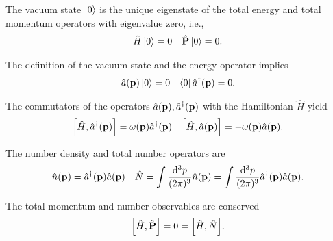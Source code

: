 \begin{definition}\label{def:vacuum_state}
	The vacuum state $\ket{0}$ is the unique eigenstate of the total energy and total momentum operators with eigenvalue zero, i.e.,
	\begin{align}
		\hat{H}
		\ket{0}
		=
		0
		&&
		\hat{\vb{P}}
		\ket{0}
		=
		0
		.
	\end{align}
\end{definition}
\begin{corollary}\label{thm:vacuum_state_ac}
	The definition of the vacuum state and the energy operator implies
	\begin{align}
		\hat{a}(\vb{p})
		\ket{0}
		=
		0
		&&
		\bra{0}
		\hat{a}^\dagger(\vb{p})
		=
		0
		.
	\end{align}
\end{corollary}
\begin{corollary}
	The commutators of the operators $\hat{a}(\vb{p}),\hat{a}^\dagger(\vb{p})$ with the Hamiltonian $\hat{H}$ yield
	\begin{align}
		\comm{\hat{H}}{\hat{a}^\dagger(\vb{p})}
		=
		\omega(\vb{p})
		\hat{a}^\dagger(\vb{p})
		&&
		\comm{\hat{H}}{\hat{a}(\vb{p})}
		=
		-
		\omega(\vb{p})
		\hat{a}(\vb{p})
		.
	\end{align}
\end{corollary}
\begin{definition}
	The number density and total number operators are
	\begin{align}
		\hat{n}(\vb{p})
		=
		\hat{a}^\dagger(\vb{p})
		\hat{a}(\vb{p})
		&&
		\hat{N}
		=
		\int\frac{\dd[3]{p}}{(2\pi)^3}
		\hat{n}(\vb{p})
		=
		\int\frac{\dd[3]{p}}{(2\pi)^3}
		\hat{a}^\dagger(\vb{p})
		\hat{a}(\vb{p})
		.
	\end{align}
\end{definition}
\begin{corollary}
	The total momentum and number observables are conserved
	\begin{equation}
		\comm{\hat{H}}{\hat{\vb{P}}}
		=
		0
		=
		\comm{\hat{H}}{\hat{N}}
		.
	\end{equation}
\end{corollary}


